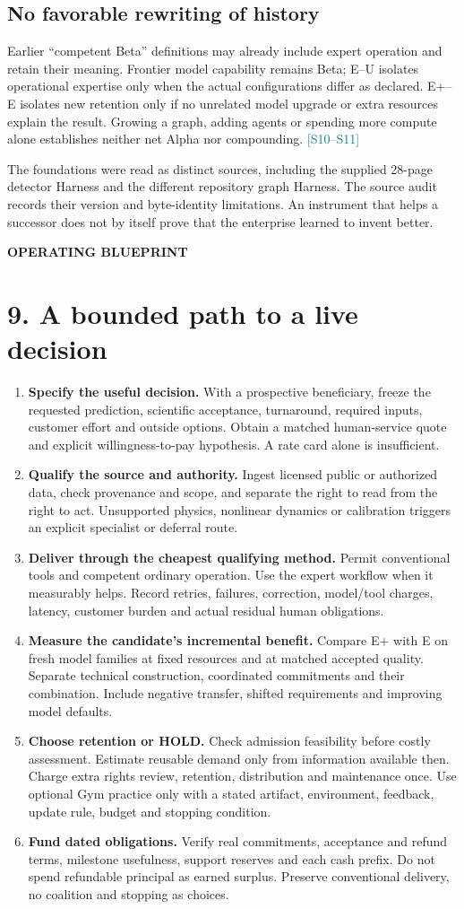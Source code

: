 \documentclass[10pt,letterpaper]{article}
\newcommand{\src}[1]{\textcolor{Teal}{\scriptsize[#1]}}
\newcommand{\eyebrow}[1]{{\small\bfseries\color{Gold}\MakeUppercase{#1}}\par}
\newcommand{\pagename}[2]{\eyebrow{#1}\section*{#2}}
\begin{document}
\subsection*{No favorable rewriting of history}
Earlier ``competent Beta'' definitions may already include expert operation and retain their meaning. Frontier model capability remains Beta; E--U isolates operational expertise only when the actual configurations differ as declared. E+--E isolates new retention only if no unrelated model upgrade or extra resources explain the result. Growing a graph, adding agents or spending more compute alone establishes neither net Alpha nor compounding. \src{S10--S11}

The foundations were read as distinct sources, including the supplied 28-page detector Harness and the different repository graph Harness. The source audit records their version and byte-identity limitations. An instrument that helps a successor does not by itself prove that the enterprise learned to invent better.

\newpage
\pagename{Operating blueprint}{9. A bounded path to a live decision}
\begin{enumerate}
\item \textbf{Specify the useful decision.} With a prospective beneficiary, freeze the requested prediction, scientific acceptance, turnaround, required inputs, customer effort and outside options. Obtain a matched human-service quote and explicit willingness-to-pay hypothesis. A rate card alone is insufficient.
\item \textbf{Qualify the source and authority.} Ingest licensed public or authorized data, check provenance and scope, and separate the right to read from the right to act. Unsupported physics, nonlinear dynamics or calibration triggers an explicit specialist or deferral route.
\item \textbf{Deliver through the cheapest qualifying method.} Permit conventional tools and competent ordinary operation. Use the expert workflow when it measurably helps. Record retries, failures, correction, model/tool charges, latency, customer burden and actual residual human obligations.
\item \textbf{Measure the candidate's incremental benefit.} Compare E+ with E on fresh model families at fixed resources and at matched accepted quality. Separate technical construction, coordinated commitments and their combination. Include negative transfer, shifted requirements and improving model defaults.
\item \textbf{Choose retention or HOLD.} Check admission feasibility before costly assessment. Estimate reusable demand only from information available then. Charge extra rights review, retention, distribution and maintenance once. Use optional Gym practice only with a stated artifact, environment, feedback, update rule, budget and stopping condition.
\item \textbf{Fund dated obligations.} Verify real commitments, acceptance and refund terms, milestone usefulness, support reserves and each cash prefix. Do not spend refundable principal as earned surplus. Preserve conventional delivery, no coalition and stopping as choices.
\end{enumerate}
\end{document}

